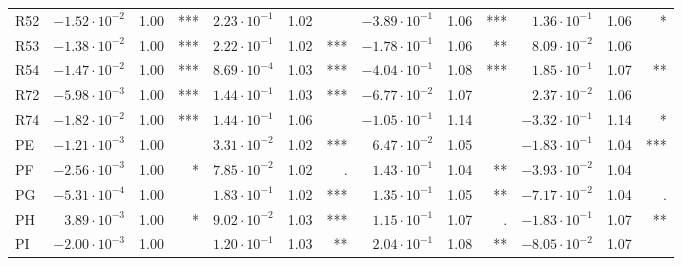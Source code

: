 \documentclass[11pt,letterpaper]{article}
\numberwithin{equation}{section}
\numberwithin{equation}{section}
\numberwithin{equation}{section}
\begin{document}
\begin{table}[!htb]
\begin{adjustwidth}{-2.5cm}{}
{\begin{tabular}{|l|rrr|rrr|rrr|rrr|}
R52 & $-1.52 \cdot 10^{-2}$      & 1.00       & ***          & $ 2.23 \cdot 10^{-1} $   & 1.02       &              & $-3.89 \cdot 10^{-1} $        & 1.06       & ***          & $1.36 \cdot 10^{-1} $      & 1.06       & *            \\
R53 &  $-1.38 \cdot 10^{-2}$     & 1.00       & ***          & $ 2.22 \cdot 10^{-1} $   & 1.02       & ***          & $-1.78 \cdot 10^{-1} $        & 1.06       & **           & $8.09 \cdot 10^{-2} $      & 1.06       &              \\
R54 &  $-1.47 \cdot 10^{-2}$  & 1.00       & ***          & $ 8.69 \cdot 10^{-4} $   & 1.03       & ***      &    $-4.04 \cdot 10^{-1} $         & 1.08       & ***          & $1.85 \cdot 10^{-1} $        & 1.07       & **           \\
R72 &  $-5.98 \cdot 10^{-3}$   & 1.00       & ***          & $ 1.44 \cdot 10^{-1} $   & 1.03       & ***          & $-6.77 \cdot 10^{-2} $      & 1.07       &              & $2.37 \cdot 10^{-2} $       & 1.06       &              \\
R74 &  $-1.82 \cdot 10^{-2}$      & 1.00       & ***          & $ 1.44 \cdot 10^{-1} $   & 1.06       &              & $-1.05 \cdot 10^{-1} $         & 1.14       &              & $-3.32 \cdot 10^{-1} $    & 1.14       & *            \\
PE    & $-1.21 \cdot 10^{-3}$     & 1.00       &              & $ 3.31 \cdot 10^{-2} $         & 1.02       & ***          & $6.47 \cdot 10^{-2} $       & 1.05       &              & $-1.83 \cdot 10^{-1} $       & 1.04       & ***          \\
PF    & $-2.56 \cdot 10^{-3}$    & 1.00       & *            & $ 7.85 \cdot 10^{-2} $   & 1.02       & .            & $1.43 \cdot 10^{-1} $       & 1.04       & **           & $-3.93 \cdot 10^{-2} $      & 1.04       &              \\
PG    & $-5.31 \cdot 10^{-4}$      & 1.00       &              & $ 1.83 \cdot 10^{-1} $   & 1.02       & ***          & $1.35 \cdot 10^{-1} $        & 1.05       & **           & $-7.17 \cdot 10^{-2} $        & 1.04       & .            \\
PH    & $3.89 \cdot 10^{-3}$     & 1.00       & *            & $ 9.02 \cdot 10^{-2} $   & 1.03       & ***          & $1.15 \cdot 10^{-1} $          & 1.07       & .            & $-1.83 \cdot 10^{-1} $     & 1.07       & **           \\
PI    & $-2.00 \cdot 10^{-3}$      & 1.00       &              & $ 1.20 \cdot 10^{-1} $   & 1.03       & **           & $2.04 \cdot 10^{-1} $        & 1.08       & **           & $-8.05 \cdot 10^{-2} $       & 1.07       &              \\

\end{tabular}}
\end{adjustwidth}
\end{table}
\end{document}
